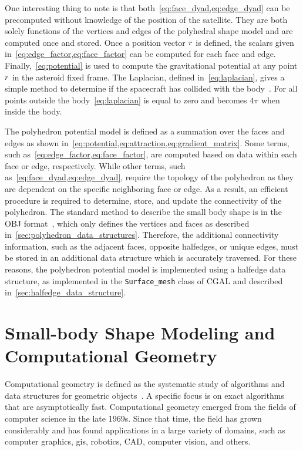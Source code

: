 One interesting thing to note is that both~\cref{eq:face_dyad,eq:edge_dyad} can be precomputed without knowledge of the position of the satellite.
They are both solely functions of the vertices and edges of the polyhedral shape model and are computed once and stored.
Once a position vector \( r \) is defined, the scalars given in~\cref{eq:edge_factor,eq:face_factor} can be computed for each face and edge.
Finally,~\cref{eq:potential} is used to compute the gravitational potential at any point \( r \) in the asteroid fixed frame.
The Laplacian, defined in~\cref{eq:laplacian}, gives a simple method to determine if the spacecraft has collided with the body~\cite{werner1996}. 
For all points outside the body~\cref{eq:laplacian} is equal to zero and becomes \( 4 \pi \) when inside the body.

The polyhedron potential model is defined as a summation over the faces and edges as shown in~\cref{eq:potential,eq:attraction,eq:gradient_matrix}.
Some terms, such as~\cref{eq:edge_factor,eq:face_factor}, are computed based on data within each face or edge, respectively.
While other terms, such as~\cref{eq:face_dyad,eq:edge_dyad}, require the topology of the polyhedron as they are dependent on the specific neighboring face or edge.
As a result, an efficient procedure is required to determine, store, and update the connectivity of the polyhedron. 
The standard method to describe the small body shape is in the OBJ format~\cite{neese2004}, which only defines the vertices and faces as described in~\cref{sec:polyhedron_data_structures}.
Therefore, the additional connectivity information, such as the adjacent faces, opposite halfedges, or unique edges, must be stored in an additional data structure which is accurately traversed.
For these reasons, the polyhedron potential model is implemented using a halfedge data structure, as implemented in the \texttt{Surface\_mesh} class of CGAL and described in~\cref{sec:halfedge_data_structure}.


 


\section{Small-body Shape Modeling and Computational Geometry}\label{sec:computational_geometry}

Computational geometry is defined as the systematic study of algorithms and data structures for geometric objects~\cite{berg2008}.
A specific focus is on exact algorithms that are asymptotically fast.
Computational geometry emerged from the fields of computer science in the late 1969s.
Since that time, the field has grown considerably and has found applications in a large variety of domains, such as computer graphics, \gls{gis}, robotics, \gls{CAD}, computer vision, and others.

